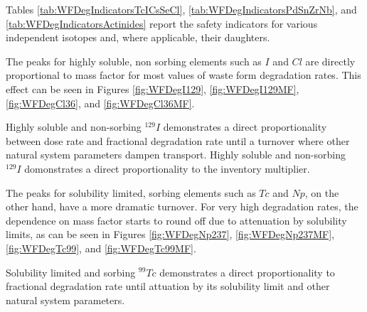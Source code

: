 Tables \ref{tab:WFDegIndicatorsTcICsSeCl}, 
\ref{tab:WFDegIndicatorsPdSnZrNb}, and 
\ref{tab:WFDegIndicatorsActinides} report the safety indicators for 
various independent isotopes and, where applicable, their daughters. 

The peaks for highly soluble, non sorbing elements such as $I$ and $Cl$
are directly proportional to mass factor for most 
values of waste form degradation rates. This effect can be seen in Figures 
\ref{fig:WFDegI129}, \ref{fig:WFDegI129MF}, \ref{fig:WFDegCl36}, and 
\ref{fig:WFDegCl36MF}. 


Highly soluble and non-sorbing $^{129}I$ demonstrates a direct proportionality between dose rate and 
fractional degradation rate until a turnover where other natural system 
parameters dampen transport. Highly soluble and non-sorbing $^{129}I$ domonstrates a direct 
proportionality to the inventory multiplier.

The peaks for solubility limited, sorbing elements such as $Tc$ and $Np$, on the 
other hand, have a more dramatic turnover.  For very high degradation rates, the 
dependence on mass factor starts to round off due to attenuation by solubility 
limits, as can be seen in Figures \ref{fig:WFDegNp237}, \ref{fig:WFDegNp237MF}, 
\ref{fig:WFDegTc99}, and \ref{fig:WFDegTc99MF}.

Solubility limited and sorbing $^{99}Tc$ demonstrates a direct proportionality 
to fractional degradation rate until attuation by its solubility limit and other 
natural system parameters.  

